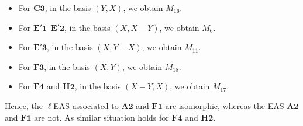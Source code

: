 \documentclass[pdftex]{sigma}
\numberwithin{equation}{section}
\begin{document}
\begin{Example}
\begin{enumerate}
\begin{itemize}
\item For $\mathbf{C3}$, in the basis $(Y,X)$, we obtain $M_{16}$.
\item For $\mathbf{E'1}\text{--}\mathbf{E'2}$, in the basis $(X,X-Y)$, we obtain $M_6$.
\item For $\mathbf{E'3}$, in the basis $(X,Y-X)$, we obtain $M_{11}$.
\item For $\mathbf{F3}$, in the basis $(X,Y)$, we obtain $M_{18}$.
\item For $\mathbf{F4}$ and $\mathbf{H2}$, in the basis $(X-Y,X)$, we obtain $M_{17}$.
\end{itemize}
Hence, the $\ell$EAS associated to $\mathbf{A2}$ and $\mathbf{F1}$ are isomorphic, whereas the EAS $\mathbf{A2}$ and $\mathbf{F1}$ are not. As similar situation holds for $\mathbf{F4}$ and $\mathbf{H2}$.


\end{enumerate}
\end{Example}
\end{document}
